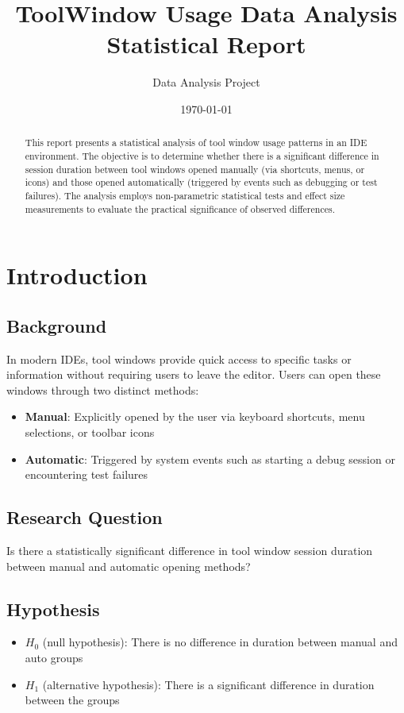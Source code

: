 \documentclass[12pt,a4paper]{article}
\title{ToolWindow Usage Data Analysis\\Statistical Report}
\author{Data Analysis Project}
\date{\today}
\begin{document}
\maketitle

\begin{abstract}
This report presents a statistical analysis of tool window usage patterns in an IDE environment. The objective is to determine whether there is a significant difference in session duration between tool windows opened manually (via shortcuts, menus, or icons) and those opened automatically (triggered by events such as debugging or test failures). The analysis employs non-parametric statistical tests and effect size measurements to evaluate the practical significance of observed differences.
\end{abstract}

\section{Introduction}

\subsection{Background}
In modern IDEs, tool windows provide quick access to specific tasks or information without requiring users to leave the editor. Users can open these windows through two distinct methods:
\begin{itemize}
    \item \textbf{Manual}: Explicitly opened by the user via keyboard shortcuts, menu selections, or toolbar icons
    \item \textbf{Automatic}: Triggered by system events such as starting a debug session or encountering test failures
\end{itemize}

\subsection{Research Question}
Is there a statistically significant difference in tool window session duration between manual and automatic opening methods?

\subsection{Hypothesis}
\begin{itemize}
    \item $H_0$ (null hypothesis): There is no difference in duration between manual and auto groups
    \item $H_1$ (alternative hypothesis): There is a significant difference in duration between the groups
\end{itemize}
\end{document}
